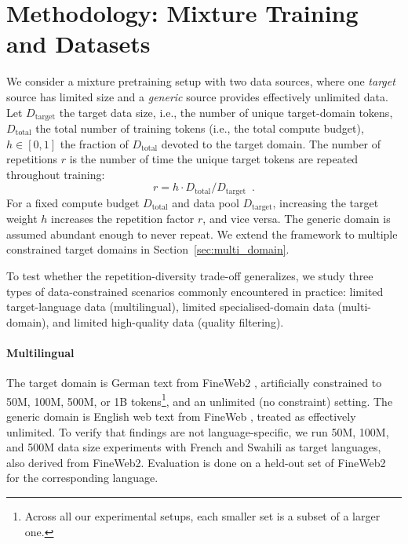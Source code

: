 \section{Methodology: Mixture Training and Datasets}
\label{sec:datasets}


We consider a mixture pretraining setup with two data sources, where one \textit{target} source has limited size and a \textit{generic} source provides effectively unlimited data. Let $D_\text{target}$ the target data size, i.e., the number of unique target-domain tokens, $D_\text{total}$ the total number of training tokens (i.e., the total compute budget), $h\in[0,1]$ the fraction of $D_\text{total}$ devoted to the target domain.  The number of repetitions $r$ is the number of time the unique target tokens are repeated throughout training:
\begin{equation}\label{eq:main}
r =  h \cdot D_\text{total}/D_\text{target} \enspace.
\end{equation}
For a fixed compute budget $D_\text{total}$ and data pool $D_\text{target}$, increasing the target weight $h$ increases the repetition factor $r$, and vice versa. 
The generic domain is assumed abundant enough to never repeat.
We extend the framework to multiple constrained target domains in Section~\ref{sec:multi_domain}.

To test whether the repetition-diversity trade-off generalizes, we study three types of data-constrained scenarios commonly encountered in practice: limited target-language data (multilingual), limited specialised-domain data (multi-domain), and limited high-quality data (quality filtering).

\paragraph{Multilingual}
The target domain is German text from FineWeb2 \citep{penedo2025fineweb2}, artificially constrained to 50M, 100M, 500M, or 1B tokens\footnote{Across all our experimental setups, each smaller set is a subset of a larger one.}, and an unlimited (no constraint) setting. The generic domain is English web text from FineWeb \citep{penedo2024fineweb}, treated as effectively unlimited. To verify that findings are not language-specific, we run 50M, 100M, and 500M data size experiments with French and Swahili as target languages, also derived from FineWeb2.
Evaluation is done on a held-out set of FineWeb2 for the corresponding language.


